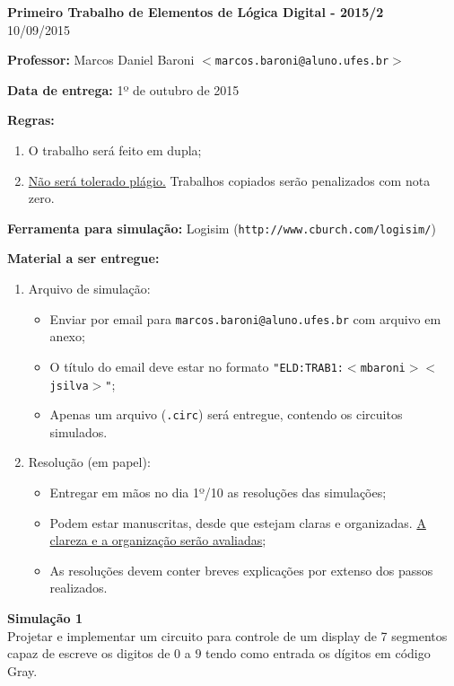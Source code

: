 \documentclass{article}
\newcommand{\titulo}[1]{{\bf #1}}
\newcommand{\itspc}{
  \vspace{-8pt}
  \setlength\itemsep{-2pt}
}
\begin{document}

\begin{center}
{\Large \bf Primeiro Trabalho de Elementos de Lógica Digital - 2015/2}
\\
10/09/2015
\vspace{5mm}
\end{center}

\noindent
\titulo{Professor:} Marcos Daniel Baroni $<$\texttt{marcos.baroni@aluno.ufes.br}$>$

\noindent
\titulo{Data de entrega:} 1º de outubro de 2015

\noindent
\titulo{Regras:}
\begin{enumerate}
  \itspc
  \item O trabalho será feito em dupla;
  \item \underline{Não será tolerado plágio.} Trabalhos copiados serão penalizados com nota zero.
\end{enumerate}

\noindent
\titulo{Ferramenta para simulação:} Logisim (\texttt{http://www.cburch.com/logisim/})

\noindent
\titulo{Material a ser entregue:}
\begin{enumerate}
  \itspc
  \item{Arquivo de simulação}:
  \begin{itemize}
    \itspc
    \item{Enviar por email para \texttt{marcos.baroni@aluno.ufes.br} com arquivo em anexo;}
    \item{O título do email deve estar no formato \texttt{"ELD:TRAB1:$<$mbaroni$><$jsilva$>$"};}
    \item{Apenas um arquivo (\texttt{.circ}) será entregue, contendo os circuitos simulados.}
  \end{itemize}
  \item{Resolução (em papel):
  \begin{itemize}
    \itspc
    \item{Entregar em mãos no dia 1º/10 as resoluções das simulações;}
    \item{Podem estar manuscritas, desde que estejam claras e organizadas.
\underline{A clareza e a organização serão avaliadas};}
    \item{As resoluções devem conter breves explicações por extenso dos passos realizados.}
  \end{itemize}
}
\end{enumerate}

\noindent
\titulo{\large Simulação 1} \\
Projetar e implementar um circuito para controle de um display de 7 segmentos capaz de escreve os digitos de $0$ a $9$ tendo como entrada os dígitos em código Gray.
\\
\end{document}
